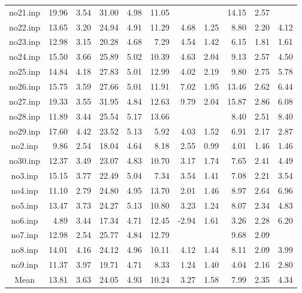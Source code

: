 {\begin{longtable}{@{}cr@{\hspace{1em}}r@{\hspace{1em}}r@{\hspace{1em}}r@{\hspace{1em}}r@{\hspace{2em}}r@{\hspace{1em}}r@{\hspace{1em}}r@{\hspace{1em}}r@{\hspace{1em}}r@{}}
no21.inp&19.96&3.54&31.00&4.98&11.05&&&14.15&2.57&\\
no22.inp&13.65&3.20&24.94&4.91&11.29&4.68&1.25&8.80&2.20&4.12\\
no23.inp&12.98&3.15&20.28&4.68&7.29&4.54&1.42&6.15&1.81&1.61\\
no24.inp&15.50&3.66&25.89&5.02&10.39&4.63&2.04&9.13&2.57&4.50\\
no25.inp&14.84&4.18&27.83&5.01&12.99&4.02&2.19&9.80&2.75&5.78\\
no26.inp&15.75&3.59&27.66&5.01&11.91&7.02&1.95&13.46&2.62&6.44\\
no27.inp&19.33&3.55&31.95&4.84&12.63&9.79&2.04&15.87&2.86&6.08\\
no28.inp&11.89&3.44&25.54&5.17&13.66&&&8.40&2.51&8.40\\
no29.inp&17.60&4.42&23.52&5.13&5.92&4.03&1.52&6.91&2.17&2.87\\
no2.inp&9.86&2.54&18.04&4.64&8.18&2.55&0.99&4.01&1.46&1.46\\
no30.inp&12.37&3.49&23.07&4.83&10.70&3.17&1.74&7.65&2.41&4.49\\
no3.inp&15.15&3.77&22.49&5.04&7.34&3.54&1.41&7.08&2.21&3.54\\
no4.inp&11.10&2.79&24.80&4.95&13.70&2.01&1.46&8.97&2.64&6.96\\
no5.inp&13.47&3.73&24.27&5.13&10.80&3.23&1.24&8.07&2.34&4.83\\
no6.inp&4.89&3.44&17.34&4.71&12.45&-2.94&1.61&3.26&2.28&6.20\\
no7.inp&12.98&2.54&25.77&4.84&12.79&&&9.68&2.09&\\
no8.inp&14.01&4.16&24.12&4.96&10.11&4.12&1.44&8.11&2.09&3.99\\
no9.inp&11.37&3.97&19.71&4.71&8.33&1.24&1.40&4.04&2.16&2.80\\
\midrule
Mean&13.81&3.63&24.05&4.93&10.24&3.27&1.58&7.99&2.35&4.34\\
\bottomrule
\end{longtable}}
